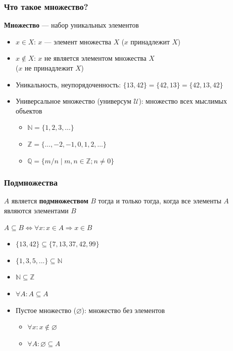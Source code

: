 \documentclass{beamer}
\begin{document}
\begin{frame}[fragile]
  \transwipe[direction=90]
  \frametitle{Что такое множество?}
  \pause

\begin{center}
    \textbf{Множество} --- набор уникальных элементов
\end{center}

  \pause 
  \begin{itemize}
    \item $x \in X$: $x$ --- элемент множества $X$ ($x$ принадлежит $X$)
    \item $x \notin X$: $x$ не является элементом множества $X$ \\ ($x$ не принадлежит $X$)
    \item Уникальность, неупорядоченность: $\{ 13, 42 \} = \{ 42, 13 \} = \{ 42, 13, 42 \}$
    \item Универсальное множество (универсум $\mathcal{U}$): множество всех мыслимых объектов
    \begin{itemize}
      \item $\mathbb{N} = \{ 1, 2, 3, \dots \}$
      \item $\mathbb{Z} = \{ \dots, -2, -1, 0, 1, 2, \dots \}$
      \item $\mathbb{Q} = \{ m / n \mid m, n \in \mathbb{Z}; n \neq 0 \}$
    \end{itemize}
  \end{itemize}
\end{frame}

\begin{frame}[fragile]
  \transwipe[direction=90]
  \frametitle{Подмножества}
  $A$ является \textbf{подмножеством} $B$ тогда и только тогда, когда все элементы $A$ являются элементами $B$
  
  \begin{center}
     $ A \subseteq B \iff \forall x : x \in A \Rightarrow x \in B $   
  \end{center} 
  
  \pause 
  \begin{itemize}
    \item $\{ 13, 42 \} \subseteq \{ 7, 13, 37, 42, 99 \}$
    \item $\{ 1, 3, 5, ...\} \subseteq \mathbb{N} $
    \item $\mathbb{N} \subseteq \mathbb{Z}$
    \item $\forall A : A \subseteq A$
  \end{itemize}
  \begin{itemize}
    \item Пустое множество ($\varnothing$): множество без элементов
    \begin{itemize}
      \item $\forall x : x \notin \varnothing$
      \item $\forall A : \varnothing \subseteq A$
    \end{itemize}
  \end{itemize}
\end{frame}
\end{document}
